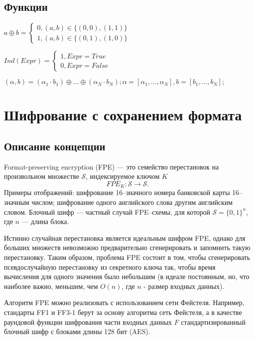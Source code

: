 \documentclass[utf8x, 14pt]{G7-32} %
\begin{document}
\section{Функции}
$
a \oplus b = \begin{cases}
0, (a,b) \in \{(0,0), (1,1)\} \\
1, (a,b) \in \{(0,1), (1,0)\}
\end{cases}
$


$  
Ind (Expr) = 
\begin{cases} 1, Expr = True\\
0, Expr = False
\end{cases}
$ 


$
(\alpha, b) = (\alpha_1 \cdot b_1) \oplus ... \oplus (\alpha_N \cdot b_N); \alpha = [\alpha_1, ..., \alpha_N], b = [b_1, ..., b_N];
$



\mainmatter %

\chapter{Шифрование с сохранением формата}

\section{Описание концепции}
Format-preserving encryption (FPE) --- это семейство перестановок на произвольном множестве $\mathcal{S}$, индексируемое ключом $K$ \cite{ruscrypto}
$$FPE_K: \mathcal{S} \to \mathcal{S}.$$
 Примеры отображений: шифрование 16--значного номера банковской карты 16--значным числом; шифрование одного английского слова другим английским словом. Блочный шифр --- частный случай FPE--схемы, для которой  $\mathcal{S} = \{0,1\}^n$, где $n$ --- длина блока.


Истинно случайная перестановка является идеальным шифром FPE, однако для больших множеств невозможно предварительно сгенерировать и запомнить такую перестановку. Таким образом, проблема FPE состоит в том, чтобы сгенерировать псевдослучайную перестановку из секретного ключа так, чтобы время вычисления для одного значения было небольшим (в идеале постоянным, но, что наиболее важно, меньшим, чем $O(n)$, где $n$ - размер входных данных).


Алгоритм FPE можно реализовать с использованием сети Фейстеля. Например, стандарты FF1 и FF3-1 \cite{FF13-1} берут за основу алгоритма сеть Фейстеля, а в качестве раундовой функции шифрования части входных данных $F$ стандартизированный блочный шифр с блоками длины 128 бит (AES).
\end{document}
